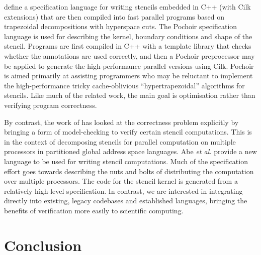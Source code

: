 \documentclass[10pt,preprint]{sigplanconf}
\theoremstyle{definition}
\begin{document}
\citet{Tang:2011:SPAA} define a specification language for writing
stencils embedded in C++ (with Cilk extensions) that are then compiled
into fast parallel programs based on trapezoidal decompositions with
hyperspace cuts. The Pochoir specification language is used for
describing the kernel, boundary conditions and shape of the
stencil. Programs are first compiled in C++ with a template library
that checks whether the annotations are used correctly, and then a
Pochoir preprocessor may be applied to generate the high-performance
parallel versions using Cilk.  Pochoir
is aimed primarily at assisting programmers who may be reluctant to
implement the high-performance tricky cache-oblivious
``hypertrapezoidal'' algorithms for stencils. 
Like much of the related work, the main goal 
is optimisation rather than verifying program correctness.

By contrast, the work of \citet{Abe:2013:IPDPSW} has looked at the
correctness problem explicitly by bringing a form of model-checking to
verify certain stencil computations. This is in the context of
decomposing stencils for parallel computation on multiple processors
 in partitioned global address
space languages. %
Abe \emph{et al.} provide a new language to
be used for writing stencil computations. Much of the specification
effort goes towards describing the nuts and bolts of distributing the
computation over multiple processors. The code for the stencil kernel
is generated from a relatively high-level specification. 
In contrast, we are interested in integrating directly
into existing, legacy codebases and established languages, bringing
the benefits of verification more easily to scientific computing.%


\section{Conclusion}\label{sec:conclusion}
\end{document}
